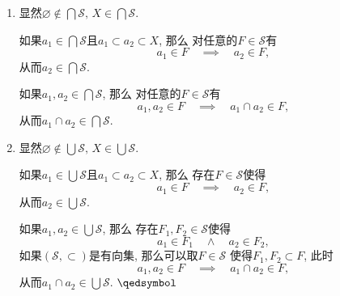 \documentclass[UTF8]{ctexart}
\begin{document}

\begin{enumerate}
    \item 显然$\displaystyle\varnothing\notin\bigcap\mathcal{S},
    \,X\in\bigcap\mathcal{S}$.

    \vspace{3pt}\hspace{2.17em}
    如果$\displaystyle a_1\in\bigcap\mathcal{S}$且$a_1\subset a_2\subset X$, 那么
    对任意的$F\in\mathcal{S}$有
    \[
        a_1\in F\quad\implies\quad a_2\in F,
    \]
    从而$\displaystyle a_2\in\bigcap\mathcal{S}$.

    \vspace{3pt}\hspace{2.17em}
    如果$\displaystyle a_1,a_2\in\bigcap\mathcal{S}$, 那么
    对任意的$F\in\mathcal{S}$有
    \[
        a_1,a_2\in F\quad\implies\quad a_1\cap a_2\in F,
    \]
    从而$\displaystyle a_1\cap a_2\in\bigcap\mathcal{S}$.

    \vspace{3pt}
    \item 显然$\displaystyle\varnothing\notin\bigcup\mathcal{S},
    \,X\in\bigcup\mathcal{S}$.

    \vspace{3pt}\hspace{2.17em}
    如果$\displaystyle a_1\in\bigcup\mathcal{S}$且$a_1\subset a_2\subset X$, 那么
    存在$F\in\mathcal{S}$使得
    \[
        a_1\in F\quad\implies\quad a_2\in F,
    \]
    从而$\displaystyle a_2\in\bigcup\mathcal{S}$.
    
    \vspace{3pt}\hspace{2.17em}
    如果$\displaystyle a_1,a_2\in\bigcup\mathcal{S}$, 那么
    存在$F_1,F_2\in\mathcal{S}$使得
    \[
        a_1\in F_1\quad\land\quad a_2\in F_2,
    \]
    如果$(\mathcal{S},\subset)$是有向集, 那么可以取$F\in\mathcal{S}$
    使得$F_1,F_2\subset F$, 此时
    \[
        a_1,a_2\in F\quad\implies\quad a_1\cap a_2\in F,
    \]
    从而$\displaystyle a_1\cap a_2\in\bigcup\mathcal{S}$. \hfill $\qedsymbol$
\end{enumerate}
\end{document}
